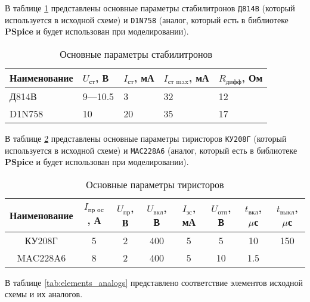 В таблице \ref{tab:stabilitrons} представлены основные параметры стабилитронов \verb+Д814В+ (который используется в исходной схеме) и \verb+D1N758+ (аналог, который есть в библиотеке \textbf{PSpice} и будет использован при моделировании).

\begin{table}[H]
\begin{center}
	\caption{Основные параметры стабилитронов}
	\label{tab:stabilitrons}
	\def\tabcolsep{10pt}
	\begin{tabular}{|l|l|l|l|l|}
		\hline
		Наименование &
		$U_\text{ст}$, В &
		$I_\text{ст}$, мА &
		$I_\text{ст max}$, мА &
		$R_\text{дифф}$, Ом \\ 
		\hline
		Д814В &
		9---10.5 &
		3 &
		32 &
		12 \\
		\hline
		D1N758 &
		10 &
		20 &
		35 &
		17 \\
		\hline
\end{tabular}
\end{center}
\end{table}

В таблице \ref{tab:thyristors} представлены основные параметры тиристоров \verb+КУ208Г+ (который используется в исходной схеме) и \verb+MAC228A6+ (аналог, который есть в библиотеке \textbf{PSpice} и будет использован при моделировании).

\begin{table}[H]
\begin{center}
	\caption{Основные параметры тиристоров}
	\label{tab:thyristors}
	\def\tabcolsep{4pt}
	\begin{tabular}{|c|c|c|c|c|c|c|c|}
		\hline
		Наименование &
		$I_\text{пр ос}$, А &
		$U_\text{пр}$, В &
		$U_\text{вкл}$, В &
		$I_\text{зс}$, мА &
		$U_\text{отп}$, В &
		$t_\text{вкл}$, $\mu$с &
		$t_\text{выкл}$, $\mu$с \\ 
		\hline
		КУ208Г &
		5 &
		2 &
		400 &
		5 &
		5 &
		10 &
		150 \\
		\hline
		MAC228A6 &
		8 &
		2 &
		400 &
		5 &
		10 &
		1.5 &
		\\
		\hline
\end{tabular}
\end{center}
\end{table}

В таблице \ref{tab:elements_analogs} представлено соответствие элементов исходной схемы и их аналогов.

